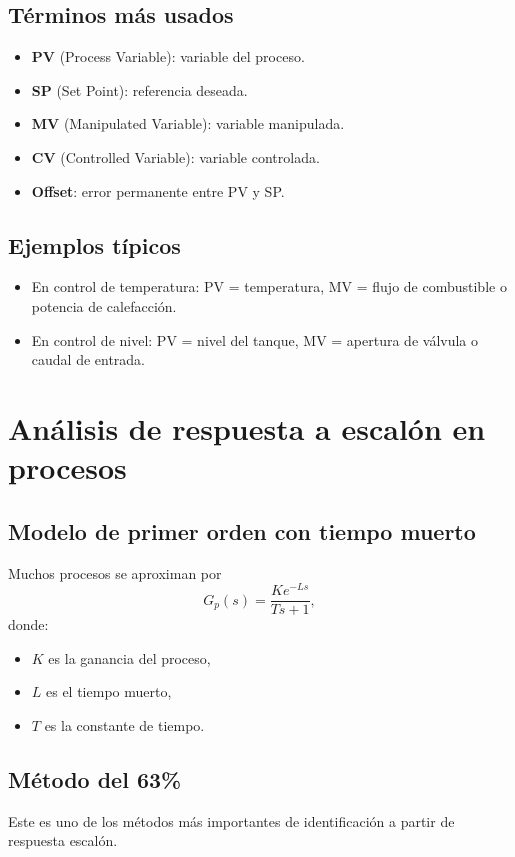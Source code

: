 \documentclass[11pt]{article}
\begin{document}
\subsection{T\'erminos m\'as usados}
\begin{itemize}
\item \textbf{PV} (Process Variable): variable del proceso.
\item \textbf{SP} (Set Point): referencia deseada.
\item \textbf{MV} (Manipulated Variable): variable manipulada.
\item \textbf{CV} (Controlled Variable): variable controlada.
\item \textbf{Offset}: error permanente entre PV y SP.
\end{itemize}

\subsection{Ejemplos t\'ipicos}
\begin{itemize}
\item En control de temperatura: PV = temperatura, MV = flujo de combustible o potencia de calefacci\'on.
\item En control de nivel: PV = nivel del tanque, MV = apertura de v\'alvula o caudal de entrada.
\end{itemize}

\section{An\'alisis de respuesta a escal\'on en procesos}
\subsection{Modelo de primer orden con tiempo muerto}
Muchos procesos se aproximan por
\begin{equation}
G_p(s)=\frac{Ke^{-Ls}}{Ts+1},
\end{equation}
donde:
\begin{itemize}
\item $K$ es la ganancia del proceso,
\item $L$ es el tiempo muerto,
\item $T$ es la constante de tiempo.
\end{itemize}

\subsection{M\'etodo del 63\%}
Este es uno de los m\'etodos m\'as importantes de identificaci\'on a partir de respuesta escal\'on.
\end{document}
